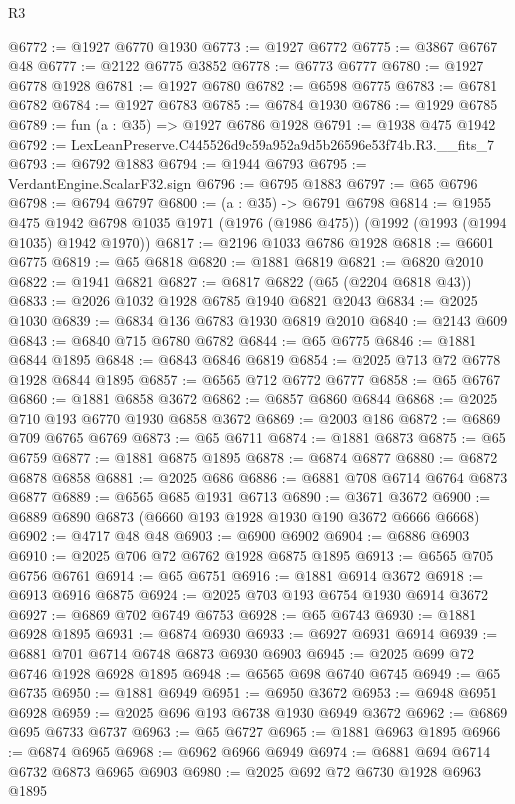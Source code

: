 \begin{lexlean}{R3}
\begin{coremodule}
@6772 := @1927 @6770 @1930
@6773 := @1927 @6772
@6775 := @3867 @6767 @48
@6777 := @2122 @6775 @3852
@6778 := @6773 @6777
@6780 := @1927 @6778 @1928
@6781 := @1927 @6780
@6782 := @6598 @6775
@6783 := @6781 @6782
@6784 := @1927 @6783
@6785 := @6784 @1930
@6786 := @1929 @6785
@6789 := fun (a : @35) => @1927 @6786 @1928
@6791 := @1938 @475 @1942
@6792 := LexLeanPreserve.C445526d9c59a952a9d5b26596e53f74b.R3.__fits_7
@6793 := @6792 @1883
@6794 := @1944 @6793
@6795 := VerdantEngine.ScalarF32.sign
@6796 := @6795 @1883
@6797 := @65 @6796
@6798 := @6794 @6797
@6800 := (a : @35) -> @6791 @6798
@6814 := @1955
    @475
    @1942
    @6798
    @1035
    @1971
    (@1976 (@1986 @475))
    (@1992 (@1993 (@1994 @1035) @1942 @1970))
@6817 := @2196 @1033 @6786 @1928
@6818 := @6601 @6775
@6819 := @65 @6818
@6820 := @1881 @6819
@6821 := @6820 @2010
@6822 := @1941 @6821
@6827 := @6817 @6822 (@65 (@2204 @6818 @43))
@6833 := @2026 @1032 @1928 @6785 @1940 @6821 @2043
@6834 := @2025 @1030
@6839 := @6834 @136 @6783 @1930 @6819 @2010
@6840 := @2143 @609
@6843 := @6840 @715 @6780 @6782
@6844 := @65 @6775
@6846 := @1881 @6844 @1895
@6848 := @6843 @6846 @6819
@6854 := @2025 @713 @72 @6778 @1928 @6844 @1895
@6857 := @6565 @712 @6772 @6777
@6858 := @65 @6767
@6860 := @1881 @6858 @3672
@6862 := @6857 @6860 @6844
@6868 := @2025 @710 @193 @6770 @1930 @6858 @3672
@6869 := @2003 @186
@6872 := @6869 @709 @6765 @6769
@6873 := @65 @6711
@6874 := @1881 @6873
@6875 := @65 @6759
@6877 := @1881 @6875 @1895
@6878 := @6874 @6877
@6880 := @6872 @6878 @6858
@6881 := @2025 @686
@6886 := @6881 @708 @6714 @6764 @6873 @6877
@6889 := @6565 @685 @1931 @6713
@6890 := @3671 @3672
@6900 := @6889 @6890 @6873 (@6660 @193 @1928 @1930 @190 @3672 @6666 @6668)
@6902 := @4717 @48 @48
@6903 := @6900 @6902
@6904 := @6886 @6903
@6910 := @2025 @706 @72 @6762 @1928 @6875 @1895
@6913 := @6565 @705 @6756 @6761
@6914 := @65 @6751
@6916 := @1881 @6914 @3672
@6918 := @6913 @6916 @6875
@6924 := @2025 @703 @193 @6754 @1930 @6914 @3672
@6927 := @6869 @702 @6749 @6753
@6928 := @65 @6743
@6930 := @1881 @6928 @1895
@6931 := @6874 @6930
@6933 := @6927 @6931 @6914
@6939 := @6881 @701 @6714 @6748 @6873 @6930 @6903
@6945 := @2025 @699 @72 @6746 @1928 @6928 @1895
@6948 := @6565 @698 @6740 @6745
@6949 := @65 @6735
@6950 := @1881 @6949
@6951 := @6950 @3672
@6953 := @6948 @6951 @6928
@6959 := @2025 @696 @193 @6738 @1930 @6949 @3672
@6962 := @6869 @695 @6733 @6737
@6963 := @65 @6727
@6965 := @1881 @6963 @1895
@6966 := @6874 @6965
@6968 := @6962 @6966 @6949
@6974 := @6881 @694 @6714 @6732 @6873 @6965 @6903
@6980 := @2025 @692 @72 @6730 @1928 @6963 @1895

\end{coremodule}
\end{lexlean}

